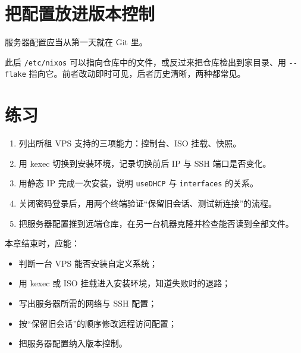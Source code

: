 \section{把配置放进版本控制}

服务器配置应当从第一天就在 Git 里。


此后 \texttt{/etc/nixos} 可以指向仓库中的文件，或反过来把仓库检出到家目录、用 \texttt{-{}-flake} 指向它。前者改动即时可见，后者历史清晰，两种都常见。

\section{练习}

\begin{enumerate}
  \item 列出所租 VPS 支持的三项能力：控制台、ISO 挂载、快照。
  \item 用 kexec 切换到安装环境，记录切换前后 IP 与 SSH 端口是否变化。
  \item 用静态 IP 完成一次安装，说明 \texttt{useDHCP} 与 \texttt{interfaces} 的关系。
  \item 关闭密码登录后，用两个终端验证“保留旧会话、测试新连接”的流程。
  \item 把服务器配置推到远端仓库，在另一台机器克隆并检查能否读到全部文件。
\end{enumerate}

\begin{checkpoint}
本章结束时，应能：
\begin{itemize}
  \item 判断一台 VPS 能否安装自定义系统；
  \item 用 kexec 或 ISO 挂载进入安装环境，知道失败时的退路；
  \item 写出服务器所需的网络与 SSH 配置；
  \item 按“保留旧会话”的顺序修改远程访问配置；
  \item 把服务器配置纳入版本控制。
\end{itemize}
\end{checkpoint}
